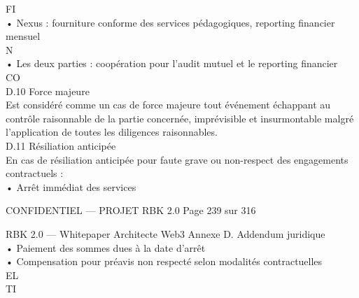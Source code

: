 \vspace{0.5em}
FI\\
• Nexus : fourniture conforme des services pédagogiques, reporting financier mensuel\\
\vspace{0.5em}
\vspace{0.5em}
\vspace{0.5em}
N\\
• Les deux parties : coopération pour l’audit mutuel et le reporting financier\\
CO\\
D.10 Force majeure\\
Est considéré comme un cas de force majeure tout événement échappant au contrôle raisonnable de la partie concernée, imprévisible et insurmontable malgré\\
l’application de toutes les diligences raisonnables.\\
\vspace{0.5em}
\vspace{0.5em}
\vspace{0.5em}
D.11 Résiliation anticipée\\
En cas de résiliation anticipée pour faute grave ou non-respect des engagements contractuels :\\
\vspace{0.5em}
• Arrêt immédiat des services\\
\vspace{0.5em}
\vspace{0.5em}
\begin{confidential}CONFIDENTIEL — PROJET RBK 2.0                                            Page 239 sur 316\end{confidential}
RBK 2.0 — Whitepaper Architecte Web3                                                    Annexe D. Addendum juridique\\
\vspace{0.5em}
\vspace{0.5em}
• Paiement des sommes dues à la date d’arrêt\\
\vspace{0.5em}
• Compensation pour préavis non respecté selon modalités contractuelles\\
\vspace{0.5em}
\vspace{0.5em}
\vspace{0.5em}
\vspace{0.5em}
EL\\
TI\\
